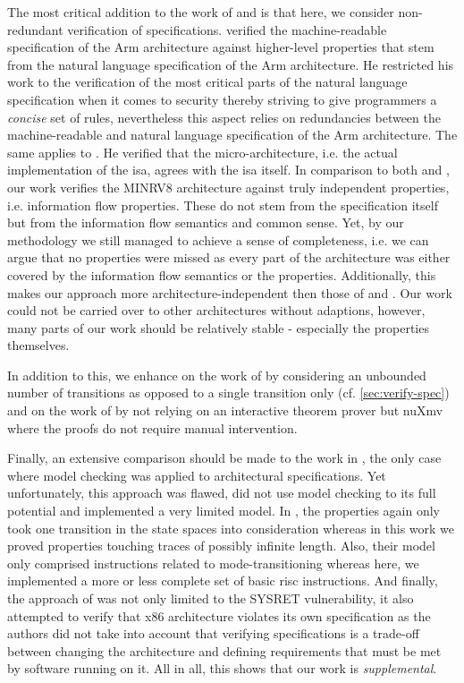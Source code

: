 The most critical addition to the work of \cite{Reid17} and \cite{Fox02} is that here, we consider non-redundant verification of specifications.
\cite{Reid17} verified the machine-readable specification of the Arm architecture against higher-level properties that stem from the natural language specification of the Arm architecture.
He restricted his work to the verification of the most critical parts of the natural language specification when it comes to security thereby striving to give programmers a \textit{concise} set of rules, nevertheless this aspect relies on redundancies between the machine-readable and natural language specification of the Arm architecture.
The same applies to \cite{Fox02}.
He verified that the micro-architecture, i.e. the actual implementation of the \gls{isa}, agrees with the \gls{isa} itself.
In comparison to both \cite{Reid17} and \cite{Fox02}, our work verifies the MINRV8 architecture against truly independent properties, i.e. information flow properties.
These do not stem from the specification itself but from the information flow semantics and common sense.
Yet, by our methodology we still managed to achieve a sense of completeness, i.e. we can argue that no properties were missed as every part of the architecture was either covered by the information flow semantics or the properties.
Additionally, this makes our approach more architecture-independent then those of \cite{Reid17} and \cite{Fox02}.
Our work could not be carried over to other architectures without adaptions, however, many parts of our work should be relatively stable - especially the properties themselves.

In addition to this, we enhance on the work of \cite{Reid17} by considering an unbounded number of transitions as opposed to a single transition only (cf. \ref{sec:verify-spec}) and on the work of \cite{Fox02} by not relying on an interactive theorem prover but nuXmv where the proofs do not require manual intervention.

Finally, an extensive comparison should be made to the work in \cite{BradfieldS16}, the only case where model checking was applied to architectural specifications.
Yet unfortunately, this approach was flawed, did not use model checking to its full potential and implemented a very limited model.
In \cite{BradfieldS16}, the properties again only took one transition in the state spaces into consideration whereas in this work we proved properties touching traces of possibly infinite length.
Also, their model only comprised instructions related to mode-transitioning whereas here, we implemented a more or less complete set of basic \gls{risc} instructions.
And finally, the approach of \cite{BradfieldS16} was not only limited to the SYSRET vulnerability, it also attempted to verify that x86 architecture violates its own specification as the authors did not take into account that verifying specifications is a trade-off between changing the architecture and defining requirements that must be met by software running on it.
All in all, this shows that our work is \textit{supplemental}.
